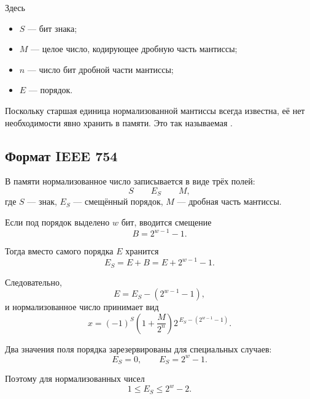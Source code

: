 \documentclass[../final.tex]{subfiles}
\begin{document}
Здесь

\begin{itemize}
    \item $S$ --- бит знака;
    \item $M$ --- целое число, кодирующее дробную часть мантиссы;
    \item $n$ --- число бит дробной части мантиссы;
    \item $E$ --- порядок.
\end{itemize}

Поскольку старшая единица нормализованной мантиссы всегда известна,
её нет необходимости явно хранить в памяти. Это так называемая
.


\subsection{Формат IEEE 754}

В памяти нормализованное число записывается в виде трёх полей:
%
\[
    \boxed{S}
    \qquad
    \boxed{E_S}
    \qquad
    \boxed{M},
\]
%
где $S$ --- знак, $E_S$ --- смещённый порядок, $M$ --- дробная
часть мантиссы.

Если под порядок выделено $w$ бит, вводится смещение
%
\begin{equation*}
    B
    =
    2^{w-1}-1.
\end{equation*}

Тогда вместо самого порядка $E$ хранится
%
\begin{equation*}
    E_S
    =
    E+B
    =
    E+2^{w-1}-1.
\end{equation*}

Следовательно,
%
\begin{equation*}
    E
    =
    E_S-\left(2^{w-1}-1\right),
\end{equation*}
%
и нормализованное число принимает вид
%
\begin{equation*}
    x
    =
    (-1)^S
    \left(
        1+\frac{M}{2^n}
    \right)
    2^{\,E_S-(2^{w-1}-1)}.
\end{equation*}

Два значения поля порядка зарезервированы для специальных случаев:
%
\[
    E_S=0,
    \qquad
    E_S=2^w-1.
\]

Поэтому для нормализованных чисел
%
\begin{equation*}
    1
    \leq
    E_S
    \leq
    2^w-2.
\end{equation*}
\end{document}
